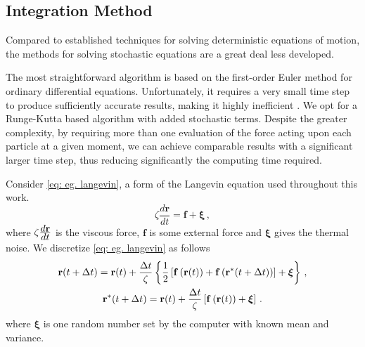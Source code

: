 \documentclass[../../main.tex]{subfiles}
\begin{document}
\begin{appendices}
%

%    
\chapter{Integration Method}\label{app: Integration Method}
    Compared to established techniques for solving deterministic equations of motion, the methods for solving stochastic equations are a great deal less developed. 
    
    The most straightforward algorithm is based on the first-order Euler method for ordinary differential equations. Unfortunately, it requires a very small time step to produce sufficiently accurate results, making it highly inefficient \cite{ermakComputerSimulationCharged1975, ermakBrownianDynamicsHydrodynamic1978}. We opt for a Runge-Kutta based algorithm with added stochastic terms. Despite the greater complexity, by requiring more than one evaluation of the force acting upon each particle at a given moment, we can achieve comparable results with a significant larger time step, thus reducing significantly the computing time required.
            
    Consider \cref{eq: eg. langevin}, a form of the Langevin equation used throughout this work.
        \begin{equation}\label{eq: eg. langevin}
            \zeta\frac{d\mathbf{r}}{dt} = \mathbf{f}+\bm{\xi} \,,
        \end{equation}
    where $\zeta\frac{\displaystyle d\mathbf{r}}{\displaystyle dt}$ is the viscous force, $\mathbf{f}$ is some external force and $\bm{\xi}$ gives the thermal noise. We discretize \cref{eq: eg. langevin} as follows
        \begin{equation}\label{eq: eg. discretized}
        \begin{gathered}
            \mathbf{r}(t + \Delta t) =  \mathbf{r}(t) + \frac{\displaystyle \Delta t}{\displaystyle \zeta}\left\{\frac{\displaystyle 1}{\displaystyle 2}\left[\mathbf{f}\left(\mathbf{r}(t)\right) + \mathbf{f}\left(\mathbf{r}^*(t + \Delta t)\right)\right] + \bm{\xi}\right\} \,, \\
            \mathbf{r}^*(t + \Delta t) =  \mathbf{r}(t) + \frac{\displaystyle \Delta t}{\displaystyle \zeta}\left[\mathbf{f}\left(\mathbf{r}(t)\right) + \bm{\xi}\right] \,.
        \end{gathered}
        \end{equation}
    where $\bm{\xi}$ is one random number set by the computer with known mean and variance.
     

\end{appendices}
\end{document}

